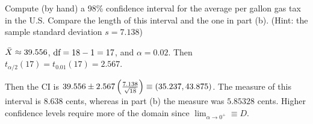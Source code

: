 Compute (by hand) a 98\% confidence interval for the average per gallon gas tax in the U.S. Compare
the length of this interval and the one in part (b). (Hint: the sample standard deviation $s = 7.138$)

\soln* $\bar{X} \approx 39.556$, $\text{df} = 18-1 = 17$, and $\alpha = 0.02$. Then $t_{\alpha/2}(17) = t_{0.01}(17) = 2.567$.

\nl Then the CI is $39.556 \pm 2.567 \pfrac{7.138}{\sqrt{18}} \equiv (35.237, 43.875)$. The measure of this interval is $8.638$ cents, whereas in part (b) the measure was $5.85328$ cents. Higher confidence levels require more of the domain since $\lim_{\alpha \to 0^+} \equiv D$. 